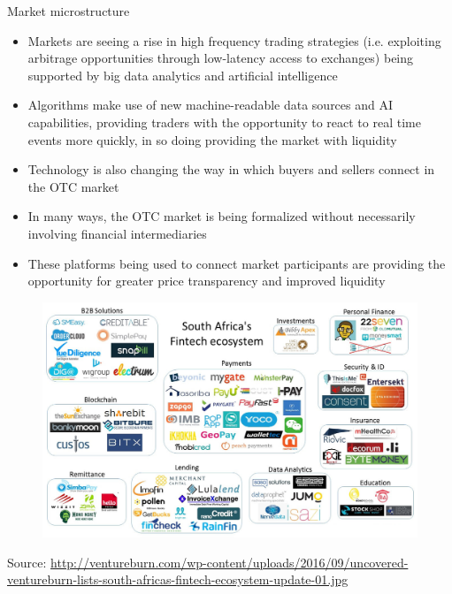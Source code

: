\documentclass[9pt]{beamer}
\begin{document}

\begin{frame}{Market microstructure}
	\begin{itemize}
		\item Markets are seeing a rise in high frequency trading strategies (i.e. exploiting arbitrage opportunities through low-latency access to exchanges) being supported by big data analytics and artificial intelligence
		\item Algorithms make use of new machine-readable data sources and AI capabilities, providing traders with the opportunity to react to real time events more quickly, in so doing providing the market with liquidity
		\item Technology is also changing the way in which buyers and sellers connect in the OTC market
		\item In many ways, the OTC market is being formalized without necessarily involving financial intermediaries
		\item These platforms being used to connect market participants are providing the opportunity for greater price transparency and improved liquidity
	\end{itemize}
\end{frame}


\begin{frame}
	\begin{figure}[]
		\centering
		\includegraphics  [scale=0.2]{Images/ecosystem}
	\end{figure}
	\begin{tiny}
		Source: \href{http://ventureburn.com/2016/09/uncovered-ventureburn-lists-south-africas-fintech-ecosystem/}{http://ventureburn.com/wp-content/uploads/2016/09/uncovered-ventureburn-lists-south-africas-fintech-ecosystem-update-01.jpg}
	\end{tiny}
\end{frame}
\end{document}
